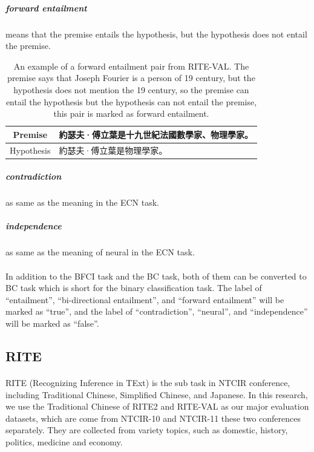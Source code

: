 \documentclass{article}
\begin{document}
\begin{CJK*}{UTF8}{bkai}
\subparagraph{forward entailment} means that the premise entails the hypothesis, but the hypothesis does not entail the premise.

\begin{table}[ht!]
  \centering
  \begin{tabular}{|c|l|}
    \hline
    Premise & 約瑟夫·傅立葉是十九世紀法國數學家、物理學家。 \\ \hline
    Hypothesis & 約瑟夫·傅立葉是物理學家。 \\ \hline
  \end{tabular}
  \caption[An example of a forward entailment pair from RITE-VAL]{An example of a forward entailment pair from RITE-VAL. The premise says that Joseph Fourier is a person of 19 century, but the hypothesis does not mention the 19 century, so the premise can entail the hypothesis but the hypothesis can not entail the premise, this pair is marked as forward entailment.}
\end{table}

\subparagraph{contradiction} as same as the meaning in the ECN task.

\subparagraph{independence} as same as the meaning of neural in the ECN task.

\paragraph{}
In addition to the BFCI task and the BC task, both of them can be converted to BC task which is short for the binary classification task. The label of ``entailment'', ``bi-directional entailment'', and ``forward entailment'' will be marked as ``true'', and the label of ``contradiction'', ``neural'', and ``independence'' will be marked as ``false''.

\subsection{RITE}
\paragraph{}
RITE (Recognizing Inference in TExt) is the sub task in NTCIR conference, including Traditional Chinese, Simplified Chinese, and Japanese. In this research, we use the Traditional Chinese of RITE2 and RITE-VAL as our major evaluation datasets, which are come from NTCIR-10\cite{ntcir10rite2} and NTCIR-11\cite{ntcir11rite-val} these two conferences separately. They are collected from variety topics, such as domestic, history, politics, medicine and economy.


\end{CJK*}
\end{document}
